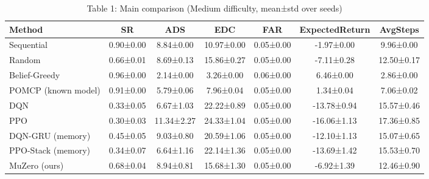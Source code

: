 \begin{table}[htbp]
\centering
\caption{Table 1: Main comparison (Medium difficulty, mean±std over seeds)}
\begin{tabular}{lcccccc}
\toprule
Method & SR & ADS & EDC & FAR & ExpectedReturn & AvgSteps \\
\midrule
Sequential & 0.90±0.00 & 8.84±0.00 & 10.97±0.00 & 0.05±0.00 & -1.97±0.00 & 9.96±0.00 \\
Random & 0.66±0.01 & 8.69±0.13 & 15.86±0.27 & 0.05±0.00 & -7.11±0.28 & 12.50±0.17 \\
Belief-Greedy & 0.96±0.00 & 2.14±0.00 & 3.26±0.00 & 0.06±0.00 & 6.46±0.00 & 2.86±0.00 \\
POMCP (known model) & 0.91±0.00 & 5.79±0.06 & 7.96±0.04 & 0.05±0.00 & 1.34±0.04 & 7.06±0.02 \\
DQN & 0.33±0.05 & 6.67±1.03 & 22.22±0.89 & 0.05±0.00 & -13.78±0.94 & 15.57±0.46 \\
PPO & 0.30±0.03 & 11.34±2.27 & 24.33±1.04 & 0.05±0.00 & -16.06±1.13 & 17.36±0.85 \\
DQN-GRU (memory) & 0.45±0.05 & 9.03±0.80 & 20.59±1.06 & 0.05±0.00 & -12.10±1.13 & 15.07±0.65 \\
PPO-Stack (memory) & 0.34±0.07 & 6.64±1.16 & 22.14±1.36 & 0.05±0.00 & -13.69±1.42 & 15.53±0.70 \\
MuZero (ours) & 0.68±0.04 & 8.94±0.81 & 15.68±1.30 & 0.05±0.00 & -6.92±1.39 & 12.46±0.90 \\
\bottomrule
\end{tabular}
\end{table}

